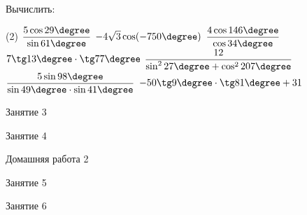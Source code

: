\begin{homework}[number=1]
	\begin{listofex}
		\item Вычислить: %
		\begin{tasks}(2)
			\task \( \dfrac{5\cos29\degree}{\sin61\degree} \)
			\task \( -4\sqrt{3}\cos(-750\degree) \)
			\task \( \dfrac{4\cos146\degree}{\cos34\degree} \)
			\task \( 7\tg13\degree\cdot\tg77\degree \)
			\task \( \dfrac{12}{\sin^227\degree+\cos^2207\degree} \)
			\task \( \dfrac{5\sin98\degree}{\sin49\degree\cdot\sin41\degree} \)
			\task \( -50\tg9\degree\cdot\tg81\degree+31 \)
		\end{tasks}
	\end{listofex}
\end{homework}

\begin{class}[number=3]
	\begin{listofex}
		\item Занятие 3 
	\end{listofex}
\end{class}

\begin{class}[number=4]
	\begin{listofex}
		\item Занятие 4
	\end{listofex}
\end{class}

\begin{homework}[number=2]
	\begin{listofex}
		\item Домашняя работа 2
	\end{listofex}
\end{homework}

\begin{class}[number=5]
	\begin{listofex}
		\item Занятие 5
	\end{listofex}
\end{class}

\begin{class}[number=6]
	\begin{listofex}
		\item Занятие 6
	\end{listofex}
\end{class}

